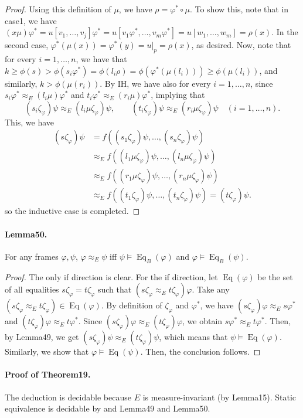 \begin{proof}
Using this definition of $\mu$, we have $\rho=\varphi^*\circ\mu$.
To show this, note that in case1, we have $(x\mu)\varphi^*=u[v_1,\ldots,v_j]\varphi^*=u[v_1\varphi^*,\ldots,v_m\varphi^*]=u[w_1,\ldots,w_m]=\rho(x)$.
In the second case, $\varphi^*(\mu(x))=\varphi^*(y)=u|_p=\rho(x)$, as desired.
Now, note that for every $i=1,\ldots,n$, we have that $k\ge\phi(s)>\phi(s_i\varphi^*)=\phi(l_i\rho)=\phi(\varphi^*(\mu(l_i)))\ge\phi(\mu(l_i))$, and similarly, $k>\phi(\mu(r_i))$.
By IH, we have also for every $i=1,\ldots,n$, since $s_i\varphi^*\approx_E(l_i\mu)\varphi^*$ and $t_i\varphi^*\approx_E(r_i\mu)\varphi^*$, implying that
\[
(s_i\zeta_\varphi)\psi\approx_E(l_i\mu\zeta_\varphi)\psi,\qquad (t_i\zeta_\varphi)\psi\approx_E(r_i\mu\zeta_\varphi)\psi\quad(i=1,\ldots,n).
\]
This, we have
\begin{align*}
(s\zeta_\varphi)\psi&=f((s_1\zeta_\varphi)\psi,\ldots,(s_n\zeta_\varphi)\psi)\\
&\approx_Ef((l_1\mu\zeta_\varphi)\psi,\ldots,(l_n\mu\zeta_\varphi)\psi)\\
&\approx_Ef((r_1\mu\zeta_\varphi)\psi,\ldots,(r_n\mu\zeta_\varphi)\psi)\\
&\approx_Ef((t_1\zeta_\varphi)\psi,\ldots,(t_n\zeta_\varphi)\psi)=(t\zeta_\varphi)\psi.
\end{align*}
so the inductive case is completed.
\end{proof}
\paragraph{Lemma50.} For any frames $\varphi,\psi$, $\varphi\approx_E\psi$ iff $\psi\models\operatorname{Eq}_B(\varphi)$ and $\varphi\models\operatorname{Eq}_B(\psi)$.
\begin{proof}
The only if direction is clear. For the if direction, let $\operatorname{Eq}(\varphi)$ be the set of all equalities $s\zeta_\varphi=t\zeta_\varphi$ such that $(s\zeta_\varphi\approx_Et\zeta_\varphi)\varphi$.
Take any $(s\zeta_\varphi\approx_Et\zeta_\varphi)\in\operatorname{Eq}(\varphi)$.
By definition of $\zeta_\varphi$ and $\varphi^*$, we have $(s\zeta_\varphi)\varphi\approx_Es\varphi^*$ and $(t\zeta_\varphi)\varphi\approx_Et\varphi^*$.
Since $(s\zeta_\varphi)\varphi\approx_E(t\zeta_\varphi)\varphi$, we obtain $s\varphi^*\approx_Et\varphi^*$.
Then, by Lemma49, we get $(s\zeta_\varphi)\psi\approx_E(t\zeta_\varphi)\psi$, which means that $\psi\models\operatorname{Eq}(\varphi)$.
Similarly, we show that $\varphi\models\operatorname{Eq}(\psi)$. Then, the conclusion follows.
\end{proof}
\paragraph{Proof of Theorem19.}
The deduction is decidable because $E$ is measure-invariant (by Lemma15). Static equivalence is decidable by and Lemma49 and Lemma50.

